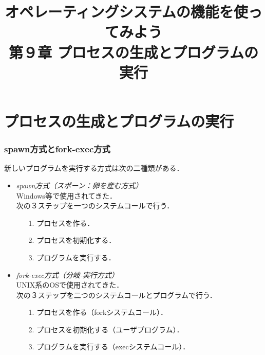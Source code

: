 \documentclass{beamer}                 %
\begin{document}
\title{オペレーティングシステムの機能を使ってみよう\\
第９章 プロセスの生成とプログラムの実行}
\date{}

\begin{frame}
  \titlepage
\end{frame}

\section{プロセスの生成とプログラムの実行}
\begin{frame}[fragile]
  \frametitle{spawn方式とfork-exec方式}
  新しいプログラムを実行する方式は次の二種類がある．
  \vfill
  \begin{itemize}
  \item \emph{spawn方式（スポーン：卵を産む方式）} \\
    Windows等で使用されてきた． \\
    次の３ステップを一つのシステムコールで行う．
    \begin{enumerate}
    \item[1.] プロセスを作る．
    \item[2.] プロセスを初期化する．
    \item[3.] プログラムを実行する．
    \end{enumerate}
  \vfill
  \item \emph{fork-exec方式（分岐-実行方式）} \\
    UNIX系のOSで使用されてきた． \\
    次の３ステップを二つのシステムコールとプログラムで行う．
    \begin{enumerate}
    \item[1.] プロセスを作る（forkシステムコール）．
    \item[2.] プロセスを初期化する（ユーザプログラム）．
    \item[3.] プログラムを実行する（execシステムコール）．
    \end{enumerate}
  \end{itemize}
  \vfill
\end{frame}
\end{document}
